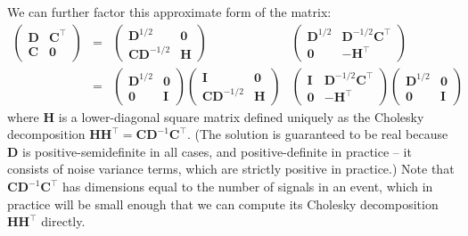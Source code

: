 We can further factor this approximate form of the matrix:
\begin{equation}
\begin{array}{cccc}
\begin{pmatrix}
\mathbf{D} & \mathbf{C}^\top \\
\mathbf{C} & \mathbf{0}
\end{pmatrix}
&=&
\begin{pmatrix}
\mathbf{D}^{1/2} & \mathbf{0} \\
\mathbf{C} \mathbf{D}^{-1/2} & \mathbf{H}
\end{pmatrix}
&
\begin{pmatrix}
\mathbf{D}^{1/2} & \mathbf{D}^{-1/2}\mathbf{C}^\top \\
\mathbf{0} & -\mathbf{H}^\top
\end{pmatrix}\\[1em]
&=&

\begin{pmatrix}
\mathbf{D}^{1/2} & \mathbf{0}\\
\mathbf{0} & \mathbf{I}
\end{pmatrix}
\begin{pmatrix}
\mathbf{I} & \mathbf{0}\\
\mathbf{C} \mathbf{D}^{-1/2} & \mathbf{H}
\end{pmatrix}
&
\begin{pmatrix}
\mathbf{I} & \mathbf{D}^{-1/2}\mathbf{C}^\top\\
\mathbf{0} & -\mathbf{H}^\top
\end{pmatrix}
\begin{pmatrix}
\mathbf{D}^{1/2} & \mathbf{0}\\
\mathbf{0} & \mathbf{I}
\end{pmatrix}

\end{array}
\end{equation}
where $\mathbf{H}$ is a lower-diagonal square matrix defined uniquely as the Cholesky decomposition $\mathbf{HH}^\top = \mathbf{C} \mathbf{D}^{-1} \mathbf{C}^\top$.  (The solution is guaranteed to be real because $\mathbf{D}$ is positive-semidefinite in all cases, and positive-definite in practice -- it consists of noise variance terms, which are strictly positive in practice.)  Note that $\mathbf{C} \mathbf{D}^{-1} \mathbf{C}^\top$ has dimensions equal to the number of signals in an event, which in practice will be small enough that we can compute its Cholesky decomposition $\mathbf{HH}^\top$ directly.


